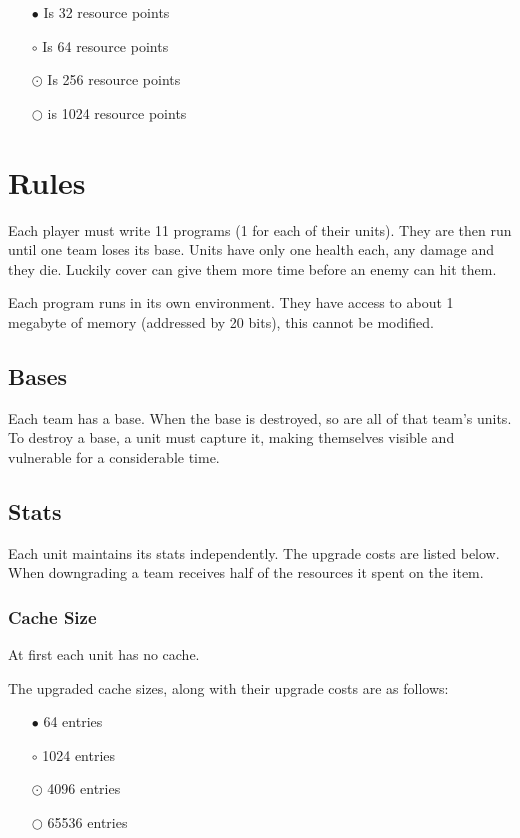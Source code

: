 \documentclass{article}
\begin{document}
\begin{itemize}[noitemsep]
    \item[$\bullet$] Is 32 resource points
    \item[$\circ$] Is 64 resource points
    \item[$\odot$] Is 256 resource points
    \item[$\bigcirc$] is 1024 resource points
\end{itemize}

\section*{Rules}

Each player must write 11 programs (1 for each of their units). They are then
run until one team loses its base. Units have only one health each, any damage
and they die. Luckily cover can give them more time before an enemy can hit
them.

Each program runs in its own environment. They have access to about 1 megabyte
of memory (addressed by 20 bits), this cannot be modified.

\subsection*{Bases}

Each team has a base. When the base is destroyed, so are all of that team's
units. To destroy a base, a unit must capture it, making themselves visible and
vulnerable for a considerable time.

\subsection*{Stats}

Each unit maintains its stats independently. The upgrade costs are listed below.
When downgrading a team receives half of the resources it spent on the item.

\subsubsection*{Cache Size}

At first each unit has no cache.

The upgraded cache sizes, along with their upgrade costs are as follows:

\begin{itemize}[noitemsep]
    \item[$\bullet$] 64 entries
    \item[$\circ$] 1024 entries
    \item[$\odot$] 4096 entries
    \item[$\bigcirc$] 65536 entries
\end{itemize}
\end{document}
